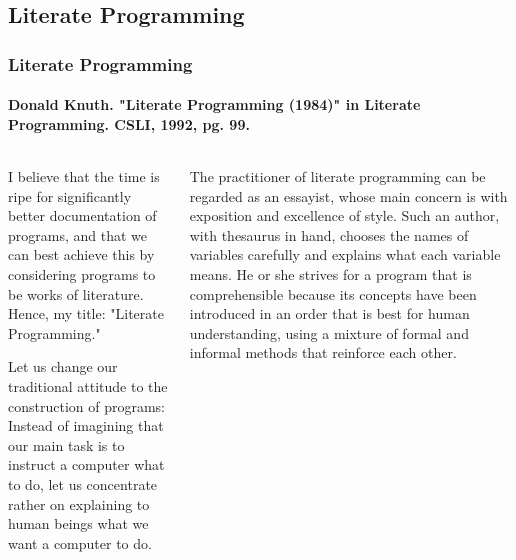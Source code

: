 \documentclass{beamer}
\begin{document}
\subsection{Literate Programming}
\frame
{
  \frametitle{Literate Programming}
  \framesubtitle{Donald Knuth. "Literate Programming (1984)" in Literate Programming. CSLI, 1992, pg. 99.}
  \footnotesize

\begin{columns}
	\begin{column}{6cm}
I believe that the time is ripe for significantly better documentation of programs, and that we can best achieve this by considering programs to be works of literature. Hence, my title: "Literate Programming."

Let us change our traditional attitude to the construction of programs: Instead of imagining that our main task is to instruct a computer what to do, let us concentrate rather on explaining to human beings what we want a computer to do.	
	\end{column}
\pause
	\begin{column}{6cm}
The practitioner of literate programming can be regarded as an essayist, whose main concern is with exposition and excellence of style. Such an author, with thesaurus in hand, chooses the names of variables carefully and explains what each variable means. He or she strives for a program that is comprehensible because its concepts have been introduced in an order that is best for human understanding, using a mixture of formal and informal methods that reinforce each other.	
	\end{column}
\end{columns}

}
\end{document}
